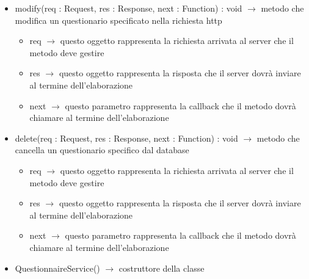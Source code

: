 \begin{description}
\begin{itemize}
	\item modify(req : Request, res : Response, next : Function) : void $\rightarrow$ metodo che modifica un questionario specificato nella richiesta http\begin{itemize}
		\item req $\rightarrow$ questo oggetto rappresenta la richiesta arrivata al server che il metodo deve gestire
		\item res $\rightarrow$ questo oggetto rappresenta la risposta che il server dovrà inviare al termine dell'elaborazione
		\item next $\rightarrow$ questo parametro rappresenta la callback che il metodo dovrà chiamare al termine dell'elaborazione
	\end{itemize}
	
	\item delete(req : Request, res : Response, next : Function) : void $\rightarrow$ metodo che cancella un questionario specifico dal database\begin{itemize}
		\item req $\rightarrow$ questo oggetto rappresenta la richiesta arrivata al server che il metodo deve gestire
		\item res $\rightarrow$ questo oggetto rappresenta la risposta che il server dovrà inviare al termine dell'elaborazione
		\item next $\rightarrow$ questo parametro rappresenta la callback che il metodo dovrà chiamare al termine dell'elaborazione
	\end{itemize}
	
	\item QuestionnaireService() $\rightarrow$ costruttore della classe
\end{itemize}

\end{description}

\vspace{0.5cm}
\hypertarget{server::service::QuestionService}{}
